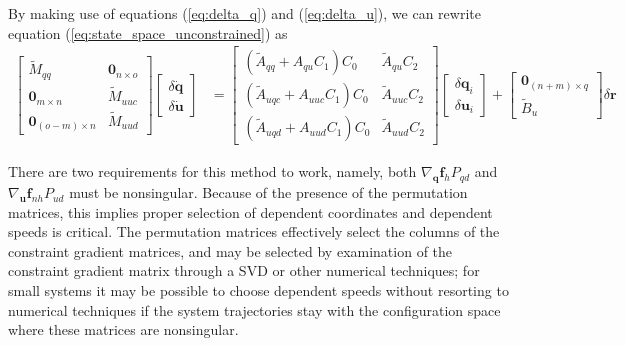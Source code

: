 \documentclass{svjour3}                     %
\begin{document}
By making use of equations (\ref{eq:delta_q}) and (\ref{eq:delta_u}), we can
rewrite equation (\ref{eq:state_space_unconstrained}) as
\begin{align}
  \label{eq:state_space_constrained}
  \left[
    \begin{array}{cc}
      \tilde{M}_{qq} & \bm{0}_{n \times o} \\
      \bm{0}_{m \times n} & \tilde{M}_{uuc} \\
      \bm{0}_{(o-m) \times n} & \tilde{M}_{uud}
    \end{array}
    \right]
    \left[
      \begin{array}{c}
        \delta \bm{\dot{q}} \\
        \delta \bm{\dot{u}}
      \end{array}
    \right]
   &=
   \left[
     \begin{array}{cc}
       (\tilde{A}_{qq} + A_{qu} C_1 ) C_0 & \tilde{A}_{qu} C_2 \\
       (\tilde{A}_{uqc} + A_{uuc} C_1 ) C_0 & \tilde{A}_{uuc} C_2\\
       (\tilde{A}_{uqd} + A_{uud} C_1 ) C_0 & \tilde{A}_{uud} C_2
     \end{array}
   \right]
    \left[
      \begin{array}{c}
        \delta \bm{q}_i \\
        \delta \bm{u}_i
      \end{array}
    \right]
    +
    \left[
      \begin{array}{c}
        \bm{0}_{(n+m) \times q} \\
        \tilde{B}_{u}
      \end{array}
    \right]
    \delta \bm{r}
\end{align}

There are two requirements for this method to work, namely, both
$\nabla_{\bm{q}}\bm{f}_{h} P_{qd}$ and $\nabla_{\bm{u}} \bm{f}_{nh} P_{ud}$
must be nonsingular.  Because of the presence of the permutation matrices, this
implies proper selection of dependent coordinates and dependent speeds is
critical.  The permutation matrices effectively select the columns of the
constraint gradient matrices, and may be selected by examination of the
constraint gradient matrix through a SVD or other numerical techniques; for
small systems it may be possible to choose dependent speeds without resorting
to numerical techniques if the system trajectories stay with the configuration
space where these matrices are nonsingular.
\end{document}
